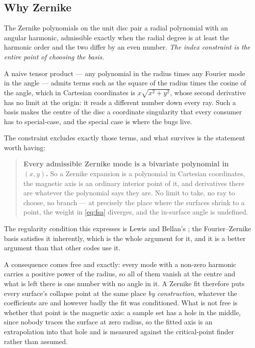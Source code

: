\subsection{Why Zernike}

The Zernike polynomials on the unit disc pair a radial polynomial with an angular
harmonic, admissible exactly when the radial degree is at least the harmonic
order and the two differ by an even number. \emph{The index constraint is the
entire point of choosing the basis.}

A naive tensor product --- any polynomial in the radius times any Fourier mode in
the angle --- admits terms such as the square of the radius times the cosine of
the angle, which in Cartesian coordinates is $x\sqrt{x^{2}+y^{2}}$, whose second
derivative has no limit at the origin: it reads a different number down every
ray. Such a basis makes the centre of the disc a coordinate singularity that
every consumer has to special-case, and the special case is where the bugs live.

The constraint excludes exactly those terms, and what survives is the statement
worth having:

\begin{quote}
	\textbf{Every admissible Zernike mode is a bivariate polynomial in $(x,y)$.}
	So a Zernike expansion is a polynomial in Cartesian coordinates, the magnetic
	axis is an ordinary interior point of it, and derivatives there are whatever
	the polynomial says they are. No limit to take, no ray to choose, no branch
	--- at precisely the place where the surfaces shrink to a point, the weight
	in \eqref{eq:fsa} diverges, and the in-surface angle is undefined.
\end{quote}

The regularity condition this expresses is Lewis and Bellan's
\cite{LewisBellan1990}; the Fourier--Zernike basis satisfies it inherently, which
is the whole argument for it, and it is a better argument than that other codes
use it.

A consequence comes free and exactly: every mode with a non-zero harmonic carries
a positive power of the radius, so all of them vanish at the centre and what is
left there is one number with no angle in it. A Zernike fit therefore puts every
surface's collapse point at the same place \emph{by construction}, whatever the
coefficients are and however badly the fit was conditioned. What is not free is
whether that point is the magnetic axis: a sample set has a hole in the middle,
since nobody traces the surface at zero radius, so the fitted axis is an
extrapolation into that hole and is measured against the critical-point finder
rather than assumed.

